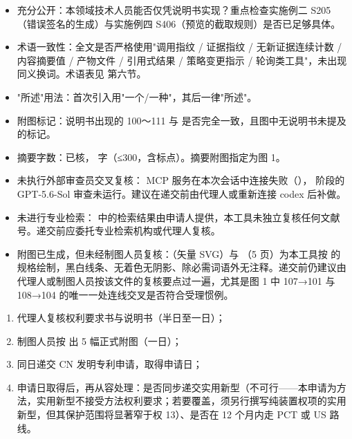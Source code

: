 \documentclass[11pt,UTF8]{ctexart}
\begin{document}
\begin{itemize}[label=\nbox]
  \item 充分公开：本领域技术人员能否仅凭说明书实现？重点检查实施例二 S205（错误签名的生成）与实施例四 S406（预览的截取规则）是否已足够具体。
  \item 术语一致性：全文是否严格使用"调用指纹 / 证据指纹 / 无新证据连续计数 / 内容摘要值 / 产物文件 / 引用式结果 / 策略变更指示 / 轮询类工具"，未出现同义换词。术语表见  第六节。
  \item "所述"用法：首次引入用"一个/一种"，其后一律"所述"。
  \item 附图标记：说明书出现的 100～111 与  是否完全一致，且图中无说明书未提及的标记。
  \item 摘要字数：已核，{ 字}（≤300，含标点）。摘要附图指定为图 1。
\end{itemize}


\begin{itemize}
  \item {\ntbf 未执行外部审查员交叉复核}： MCP 服务在本次会话中连接失败（）， 阶段的 GPT-5.6-Sol 审查未运行。建议在递交前由代理人或重新连接 codex 后补做。
  \item {\ntbf 未进行专业检索}： 中的检索结果由申请人提供，本工具未独立复核任何文献号。递交前应委托专业检索机构或代理人复核。
  \item {\ntbf 附图已生成，但未经制图人员复核}：（矢量 SVG）与 （5 页）为本工具按  的规格绘制，黑白线条、无着色无阴影、除必需词语外无注释。递交前仍建议由代理人或制图人员按该文件的复核要点过一遍，尤其是图 1 中 107→101 与 108→104 的唯一一处连线交叉是否符合受理惯例。
\end{itemize}


\begin{enumerate}
  \item 代理人复核权利要求书与说明书（半日至一日）；
  \item 制图人员按  出 5 幅正式附图（一日）；
  \item 同日递交 CN 发明专利申请，取得申请日；
  \item 申请日取得后，再从容处理：是否同步递交实用新型（{\ntbf 不可行}——本申请为方法，实用新型不接受方法权利要求；若要覆盖，须另行撰写纯装置权项的实用新型，但其保护范围将显著窄于权 13）、是否在 12 个月内走 PCT 或 US 路线。
\end{enumerate}
\end{document}
